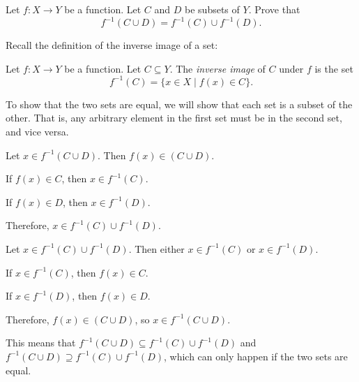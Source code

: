 \begin{problem}
  Let $f : X \to Y$ be a function.
  Let $C$ and $D$ be subsets of $Y$.
  Prove that \[ f^{-1}(C \cup D) = f^{-1}(C) \cup f^{-1}(D). \]
\end{problem}

\begin{answer}
  Recall the definition of the inverse image of a set:
  \begin{definition}
    Let $f : X \to Y$ be a function.
    Let $C \subseteq Y$.
    The \emph{inverse image} of $C$ under $f$ is the set
    \[ f^{-1}(C) = \{ x \in X \mid f(x) \in C \}. \]
  \end{definition}
  
  To show that the two sets are equal, we will show that each set is a subset
  of the other. That is, any arbitrary element in the first set must be in
  the second set, and vice versa.

  \begin{enumroman}
    \item Let $x \in f^{-1}(C \cup D)$. Then $f(x) \in (C \cup D)$.
      \begin{enumarabic}
        \item If $f(x) \in C$, then $x \in f^{-1}(C)$.
        \item If $f(x) \in D$, then $x \in f^{-1}(D)$.
      \end{enumarabic}
      Therefore, $x \in f^{-1}(C) \cup f^{-1}(D)$.

    \item Let $x \in f^{-1}(C) \cup f^{-1}(D)$. Then either $x \in f^{-1}(C)$
      or $x \in f^{-1}(D)$.
      \begin{enumarabic}
        \item If $x \in f^{-1}(C)$, then $f(x) \in C$.
        \item If $x \in f^{-1}(D)$, then $f(x) \in D$.
      \end{enumarabic}
      Therefore, $f(x) \in (C \cup D)$, so $x \in f^{-1}(C \cup D)$.
  \end{enumroman}

  \step
  This means that $f^{-1}(C \cup D) \subseteq f^{-1}(C) \cup f^{-1}(D)$
  and $f^{-1}(C \cup D) \supseteq f^{-1}(C) \cup f^{-1}(D)$,
  which can only happen if the two sets are equal.

\end{answer}
